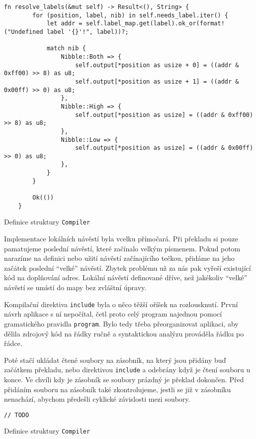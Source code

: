 \begin{listing}
\begin{verbatim}
fn resolve_labels(&mut self) -> Result<(), String> {
        for (position, label, nib) in self.needs_label.iter() {
            let addr = self.label_map.get(label).ok_or(format!("Undefined label '{}'!", label))?;

            match nib {
                Nibble::Both => {
                    self.output[*position as usize + 0] = ((addr & 0xff00) >> 8) as u8;
                    self.output[*position as usize + 1] = ((addr & 0x00ff) >> 0) as u8;
                },
                Nibble::High => {
                    self.output[*position as usize] = ((addr & 0xff00) >> 8) as u8;
                },
                Nibble::Low => {
                    self.output[*position as usize] = ((addr & 0x00ff) >> 0) as u8;
                },
            }
        }

        Ok(())
    }
\end{verbatim}
\caption{Definice struktury \texttt{Compiler}}
\label{fig:rust-result}
\end{listing}

Implementace lokálních návěstí byla vcelku přímočará. Při překladu si pouze pamatujeme poslední návěstí, které začínalo velkým písmenem. Pokud potom narazíme na definici nebo užití návěstí začínajícího tečkou, přidáme na jeho začátek poslední ``velké'' návěstí. Zbytek problému už za nás pak vyřeší existující kód na doplňování adres. Lokální návěstí definované dříve, než jakékoliv ``velké'' návěstí se umístí do mapy bez zvláštní úpravy.

Kompilační direktiva \texttt{include} byla o něco těžší oříšek na rozlousknutí. První návrh aplikace s ní nepočítal, četl proto celý program najednou pomocí gramatického pravidla \texttt{program}. Bylo tedy třeba přeorganizovat aplikaci, aby dělila zdrojový kód na řádky ručně a syntaktickou analýzu prováděla řádku po řádce.

Poté stačí ukládat čtené soubory na zásobník, na který jsou přidány buď začátkem překladu, nebo direktivou \texttt{include} a odebrány když je čtení souboru u konce. Ve chvíli kdy je zásobník se soubory prázdný je překlad dokončen. Před přidáním souboru na zásobník také zkontrolujeme, jestli se již v zásobníku nenachází, abychom předešli cyklické závislosti mezi soubory.

\begin{listing}
\begin{verbatim}
// TODO
\end{verbatim}
\caption{Definice struktury \texttt{Compiler}}
\label{fig:rust-file-stack}
\end{listing}

